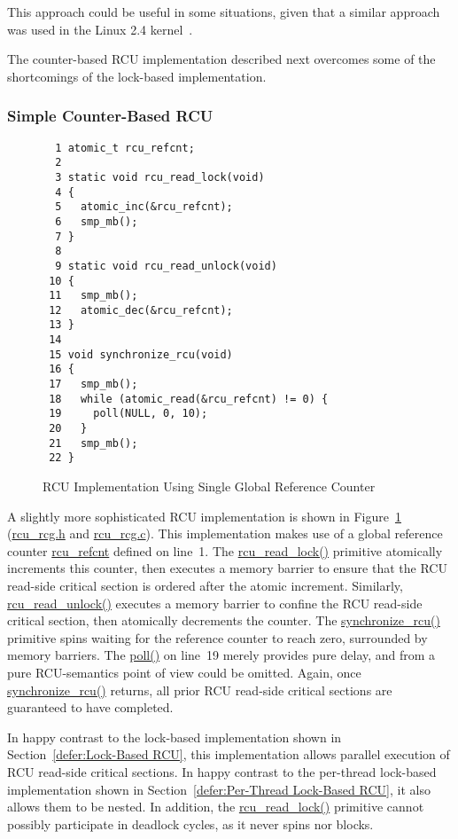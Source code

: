 This approach could be useful in some situations, given that a similar
approach was used in the
Linux 2.4 kernel~\cite{Molnar00a}.

The counter-based RCU implementation described next overcomes some of
the shortcomings of the lock-based implementation.

\subsubsection{Simple Counter-Based RCU}
\label{defer:Simple Counter-Based RCU}

\begin{figure}[tbp]
{ \scriptsize
\begin{verbatim}
  1 atomic_t rcu_refcnt;
  2
  3 static void rcu_read_lock(void)
  4 {
  5   atomic_inc(&rcu_refcnt);
  6   smp_mb();
  7 }
  8
  9 static void rcu_read_unlock(void)
 10 {
 11   smp_mb();
 12   atomic_dec(&rcu_refcnt);
 13 }
 14
 15 void synchronize_rcu(void)
 16 {
 17   smp_mb();
 18   while (atomic_read(&rcu_refcnt) != 0) {
 19     poll(NULL, 0, 10);
 20   }
 21   smp_mb();
 22 }
\end{verbatim}
}
\caption{RCU Implementation Using Single Global Reference Counter}
\label{fig:defer:RCU Implementation Using Single Global Reference Counter}
\end{figure}

A slightly more sophisticated RCU implementation is shown in
Figure~\ref{fig:defer:RCU Implementation Using Single Global Reference Counter}
(\url{rcu_rcg.h} and \url{rcu_rcg.c}).
This implementation makes use of a global reference counter
\url{rcu_refcnt} defined on line~1.
The \url{rcu_read_lock()} primitive atomically increments this
counter, then executes a memory barrier to ensure that the
RCU read-side critical section is ordered after the atomic
increment.
Similarly, \url{rcu_read_unlock()} executes a memory barrier to
confine the RCU read-side critical section, then atomically
decrements the counter.
The \url{synchronize_rcu()} primitive spins waiting for the reference
counter to reach zero, surrounded by memory barriers.
The \url{poll()} on line~19 merely provides pure delay, and from
a pure RCU-semantics point of view could be omitted.
Again, once \url{synchronize_rcu()} returns, all prior
RCU read-side critical sections are guaranteed to have completed.

In happy contrast to the lock-based implementation shown in
Section~\ref{defer:Lock-Based RCU}, this implementation
allows parallel execution of RCU read-side critical sections.
In happy contrast to the per-thread lock-based implementation shown in
Section~\ref{defer:Per-Thread Lock-Based RCU},
it also allows them to be nested.
In addition, the \url{rcu_read_lock()} primitive cannot possibly
participate in deadlock cycles, as it never spins nor blocks.

